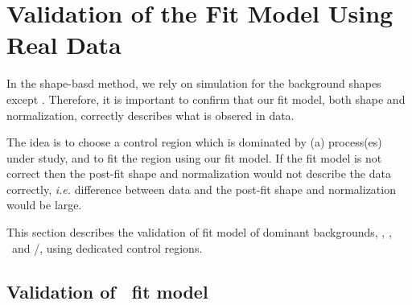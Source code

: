 


\section{Validation of the Fit Model Using Real Data}

In the shape-basd method, we rely on simulation for the background shapes 
except \Wjets. Therefore, it is important to confirm that our fit model,
both shape and normalization, correctly describes what is obsered in data. 

The idea is to choose a control region which is dominated by (a) process(es) 
under study, and to fit the region using our fit model.  
If the fit model is not correct then the post-fit shape 
and normalization would not describe the data correctly, 
\textit{i.e.} difference between data and the post-fit shape and normalization
would be large. 

This section describes the validation of fit model of dominant backgrounds, 
\qqww, \topbkg, \Wjets\ and \wgamma/\wgammastar, using dedicated control regions. 

\subsection{Validation of \qqww\ fit model}  

